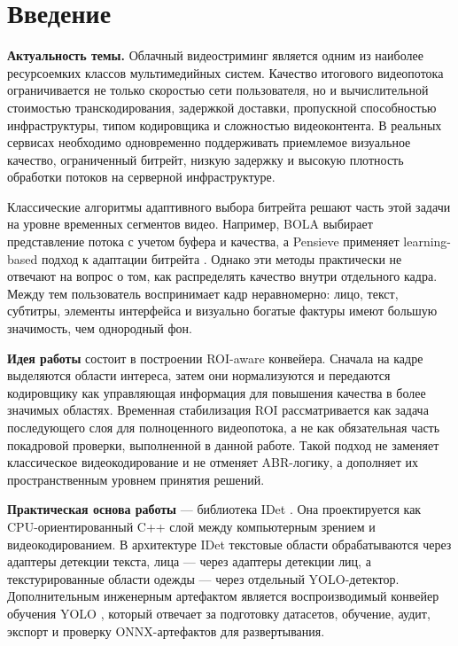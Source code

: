 \documentclass[12pt,a4paper,oneside,openany]{report}
\newcommand{\important}[1]{\textbf{#1}}
\begin{document}
\clearpage


\chapter*{Введение}

\important{Актуальность темы.} Облачный видеостриминг является одним из наиболее ресурсоемких
классов мультимедийных систем. Качество итогового видеопотока ограничивается не только скоростью
сети пользователя, но и вычислительной стоимостью транскодирования, задержкой доставки,
пропускной способностью инфраструктуры, типом кодировщика и сложностью видеоконтента. В реальных
сервисах необходимо одновременно поддерживать приемлемое визуальное качество, ограниченный
битрейт, низкую задержку и высокую плотность обработки потоков на серверной инфраструктуре.

Классические алгоритмы адаптивного выбора битрейта решают часть этой задачи на уровне временных
сегментов видео. Например, BOLA выбирает представление потока с учетом буфера и качества, а
Pensieve применяет learning-based подход к адаптации битрейта \cite{bola,pensieve}. Однако эти
методы практически не отвечают на вопрос о том, как распределять качество внутри отдельного
кадра. Между тем пользователь воспринимает кадр неравномерно: лицо, текст, субтитры, элементы
интерфейса и визуально богатые фактуры имеют большую значимость, чем однородный фон.

\important{Идея работы} состоит в построении ROI-aware конвейера. Сначала на кадре выделяются
области интереса, затем они нормализуются и передаются кодировщику как управляющая информация для
повышения качества в более значимых областях. Временная стабилизация ROI рассматривается как
задача последующего слоя для полноценного видеопотока, а не как обязательная часть покадровой
проверки, выполненной в данной работе. Такой подход не заменяет классическое видеокодирование и
не отменяет ABR-логику, а дополняет их пространственным уровнем принятия решений.

\important{Практическая основа работы} --- библиотека IDet \cite{idet}. Она проектируется как
CPU-ориентированный C++ слой между компьютерным зрением и видеокодированием. В архитектуре IDet
текстовые области обрабатываются через адаптеры детекции текста, лица --- через адаптеры
детекции лиц, а текстурированные области одежды --- через отдельный YOLO-детектор.
Дополнительным инженерным артефактом является воспроизводимый конвейер обучения YOLO
\cite{pipeline}, который отвечает за подготовку датасетов, обучение, аудит, экспорт и проверку
ONNX-артефактов для развертывания.
\end{document}

